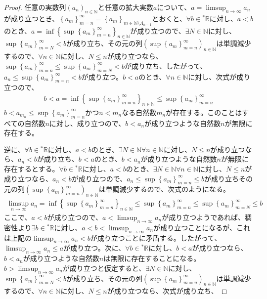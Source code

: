 \documentclass[dvipdfmx]{jsarticle}
\begin{document}
\begin{proof}
任意の実数列$\left( a_{n} \right)_{n \in \mathbb{N}}$と任意の拡大実数$a$について、$a = \limsup_{n \rightarrow \infty}a_{n}$が成り立つとき、$\left\{ a_{m} \right\}_{m = n}^{\infty} = \left\{ a_{m} \right\}_{m \in \mathbb{N} \setminus \varLambda_{n - 1}}$とおくと、$\forall b \in{}^{*}\mathbb{R}$に対し、$a < b$のとき、$a = \inf\left\{ \sup\left\{ a_{m} \right\}_{m = n}^{\infty} \right\}_{n \in \mathbb{N}}$が成り立つので、$\exists N \in \mathbb{N}$に対し、$\sup\left\{ a_{m} \right\}_{m = N}^{\infty} < b$が成り立ち、その元の列$\left( \sup\left\{ a_{m} \right\}_{m = n}^{\infty} \right)_{n \in \mathbb{N}}$は単調減少するので、$\forall n \in \mathbb{N}$に対し、$N \leq n$が成り立つなら、$\sup\left\{ a_{m} \right\}_{m = n}^{\infty} \leq \sup\left\{ a_{m} \right\}_{m = N}^{\infty} < b$が成り立ち、したがって、$a_{n} \leq \sup\left\{ a_{m} \right\}_{m = n}^{\infty} < b$が成り立つ。$b < a$のとき、$\forall n \in \mathbb{N}$に対し、次式が成り立つので、
\begin{align*}
b < a = \inf\left\{ \sup\left\{ a_{m} \right\}_{m = n}^{\infty} \right\}_{n \in \mathbb{N}} \leq \sup\left\{ a_{m} \right\}_{m = n}^{\infty}
\end{align*}
$b < a_{m_{n}} \leq \sup\left\{ a_{m} \right\}_{m = n}^{\infty}$かつ$n < m_{n}$なる自然数$m_{n}$が存在する。このことはすべての自然数$n$に対し、成り立つので、$b < a_{n}$が成り立つような自然数$n$が無限に存在する。\par
逆に、$\forall b \in{}^{*}\mathbb{R}$に対し、$a < b$のとき、$\exists N \in \mathbb{N}\forall n \in \mathbb{N}$に対し、$N \leq n$が成り立つなら、$a_{n} < b$が成り立ち、$b < a$のとき、$b < a_{n}$が成り立つような自然数$n$が無限に存在するとする。$\forall b \in{}^{*}\mathbb{R}$に対し、$a < b$のとき、$\exists N \in \mathbb{N}\forall n \in \mathbb{N}$に対し、$N \leq n$が成り立つなら、$a_{n} < b$が成り立つので、$a_{n} \leq \sup\left\{ a_{m} \right\}_{m = n}^{\infty} \leq b$が成り立ちその元の列$\left( \sup\left\{ a_{m} \right\}_{m = n}^{\infty} \right)_{n \in \mathbb{N}}$は単調減少するので、次式のようになる。
\begin{align*}
\limsup_{n \rightarrow \infty}a_{n} = \inf\left\{ \sup\left\{ a_{m} \right\}_{m = n}^{\infty} \right\}_{n \in \mathbb{N}} \leq \sup\left\{ a_{m} \right\}_{m = n}^{\infty} \leq \sup\left\{ a_{m} \right\}_{m = N}^{\infty} \leq b
\end{align*}
ここで、$a < b$が成り立つので、$a < \limsup_{n \rightarrow \infty}a_{n}$が成り立つようであれば、稠密性より$\exists b \in{}^{*}\mathbb{R}$に対し、$a < b < \limsup_{n \rightarrow \infty}a_{n}$が成り立つことになるが、これは上記の$\limsup_{n \rightarrow \infty}a_{n} < b$が成り立つことに矛盾する。したがって、$\limsup_{n \rightarrow \infty}a_{n} \leq a$が成り立つ。次に、$\forall b \in{}^{*}\mathbb{R}$に対し、$b < a$が成り立つなら、$b < a_{n}$が成り立つような自然数$n$は無限に存在することになる。$b > \limsup_{n \rightarrow \infty}a_{n}$が成り立つと仮定すると、$\exists N \in \mathbb{N}$に対し、$\sup\left\{ a_{m} \right\}_{m = N}^{\infty} < b$が成り立ち、その元の列$\left( \sup\left\{ a_{m} \right\}_{m = n}^{\infty} \right)_{n \in \mathbb{N}}$は単調減少するので、$\forall n \in \mathbb{N}$に対し、$N \leq n$が成り立つなら、次式が成り立ち、

\end{proof}
\end{document}
